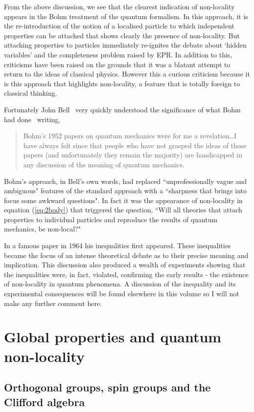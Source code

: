 \documentclass[12pt]{article}
\begin{document}
From the above discussion, we see that the clearest indication of non-locality appears in the Bohm treatment of the quantum formalism.  In this approach, it is the re-introduction of the notion of a localised particle to which independent properties can be attached that shows clearly the presence of non-locality.  But attaching properties to particles immediately re-ignites the debate about `hidden variables' and the completeness problem raised by EPR.  In addition to this, criticisms have been raised on the grounds that it was a blatant attempt to return to the ideas of classical physics.  However this a curious criticism because it is this approach that highlights  non-locality, a feature that is totally foreign to classical thinking.

Fortunately John Bell~\cite{jb87} 
very quickly understood the significance of what Bohm had done~\cite{db52} writing,
\begin{quote}
Bohm's 1952 papers on quantum mechanics were for me a revelation\dots I have always felt since that people who have not grasped the ideas of those papers (and unfortunately they remain the majority) are handicapped in any discussion of the meaning of quantum mechanics.
\end{quote}
Bohm's approach, in Bell's own words, had replaced  ``unprofessionally vague and ambiguous" features of the standard approach with a ``sharpness that brings into focus some awkward questions".  In fact it was the appearance of non-locality in equation (\ref{eq:2body}) that triggered the question,  ``Will all theories that attach properties to individual particles and reproduce the results of quantum mechanics, be non-local?"

In a famous paper in 1964 his inequalities first appeared. These inequalities became  the focus of an intense theoretical debate as to their precise meaning and implication.  This discussion also produced a wealth of experiments showing that the inequalities were, in fact, violated, confirming the early results - the existence of non-locality in quantum phenomena.  A discussion of the inequality and its experimental consequences will be found elsewhere in this volume so I will not make any further comment here. 
 
 \section{Global properties and quantum non-locality}
 
 \subsection{Orthogonal groups, spin groups and the Clifford algebra}
\end{document}
